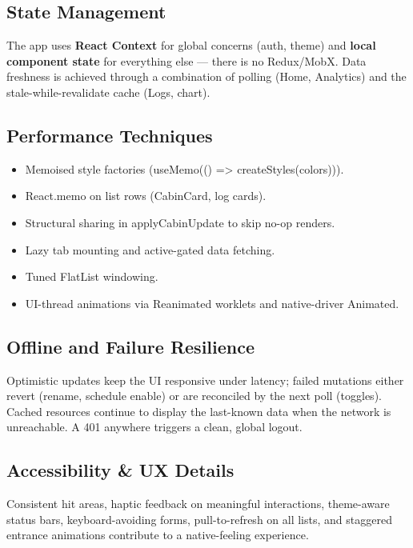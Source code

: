 \documentclass[11pt,a4paper]{article}
\newcommand{\code}[1]{\colorbox{codebg}{\ttfamily\small #1}}
\begin{document}
\subsection{State Management}

The app uses \textbf{React Context} for global concerns (auth, theme) and
\textbf{local component state} for everything else — there is no Redux/MobX. Data
freshness is achieved through a combination of polling (Home, Analytics) and the
stale-while-revalidate cache (Logs, chart).

\subsection{Performance Techniques}

\begin{itemize}[leftmargin=1.4em]
  \item Memoised style factories (\code{useMemo(() => createStyles(colors))}).
  \item \code{React.memo} on list rows (\code{CabinCard}, log cards).
  \item Structural sharing in \code{applyCabinUpdate} to skip no-op renders.
  \item Lazy tab mounting and \code{active}-gated data fetching.
  \item Tuned \code{FlatList} windowing.
  \item UI-thread animations via Reanimated worklets and native-driver Animated.
\end{itemize}

\subsection{Offline and Failure Resilience}

Optimistic updates keep the UI responsive under latency; failed mutations either
revert (rename, schedule enable) or are reconciled by the next poll (toggles).
Cached resources continue to display the last-known data when the network is
unreachable. A \code{401} anywhere triggers a clean, global logout.

\subsection{Accessibility \& UX Details}

Consistent hit areas, haptic feedback on meaningful interactions, theme-aware
status bars, keyboard-avoiding forms, pull-to-refresh on all lists, and
staggered entrance animations contribute to a native-feeling experience.
\end{document}
